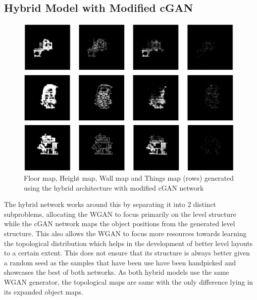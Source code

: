 \documentclass{Configuration_Files/PoliMi3i_thesis}
\begin{document}
\subsection{Hybrid Model with Modified cGAN}
\begin{figure}[H]
    \centering
    \includegraphics[width=1\textwidth]{mod_cgan_sample.jpg}
    \caption[Samples generated using the modified cGAN network]{Floor map, Height map, Wall map and Things map (rows) generated 
using the hybrid architecture with modified cGAN network}
    \label{fig:modcgansample}
\end{figure}
The hybrid network works around this by separating it into 2 distinct subproblems, 
allocating the WGAN to focus primarily on the level structure while the cGAN
network maps the object positions from the generated level structure. This also 
allows the WGAN to focus more resources towards learning the topological 
distribution which helps in the development of better level layouts to a certain 
extent. This does not ensure that its structure is always better given a random seed as 
the samples that have been use have been handpicked and showcases the best of 
both networks. As both hybrid models use the same WGAN generator, the 
topological maps are same with the only difference lying in its expanded object 
maps.
\end{document}
